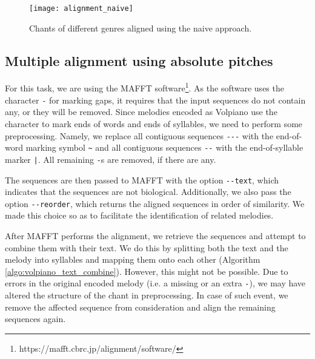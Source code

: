 \begin{figure}[h]
\centering
\texttt{[image: alignment\_naive]}
\caption{Chants of different genres aligned using the naive approach.}
\label{fig:align_naive}
\end{figure}

\subsection{Multiple alignment using absolute pitches}

For this task, we are using the MAFFT software\footnote{https://mafft.cbrc.jp/alignment/software/}. As the software uses the character \verb|-| for marking gaps,
it requires that the input sequences do not contain any, or they will be removed. Since melodies encoded as Volpiano use the character to mark ends of words
and ends of syllables, we need to perform some preprocessing. Namely, we replace all contiguous sequences \verb|---| with the end-of-word marking symbol \verb|~|
and all contiguous sequences \verb|--| with the end-of-syllable marker \verb=|=. All remaining \verb|-|s are removed, if there are any.

The sequences are then passed to MAFFT with the option \verb|--text|, which indicates that the sequences are not biological. Additionally, we also pass the option
\verb|--reorder|, which returns the aligned sequences in order of similarity. We made this choice so as to facilitate the identification of related melodies.

After MAFFT performs the alignment, we retrieve the sequences and attempt to combine them with their text.
We do this by splitting both the text and the melody into syllables and mapping them onto each other (Algorithm \ref{algo:volpiano_text_combine}). 
However, this might not be possible. Due to errors in the original encoded melody (i.e. a missing or an extra \verb|-|),
we may have altered the structure of the chant in preprocessing. In case of such event, we remove the affected sequence from consideration and align the remaining
sequences again.\newline

